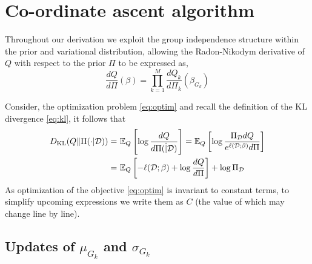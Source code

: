 \documentclass[12pt]{article}
\begin{document}
\section{Co-ordinate ascent algorithm}

Throughout our derivation we exploit the group independence structure within the prior and variational distribution, allowing the Radon-Nikodym derivative of $Q$ with respect to the prior $\Pi$ to be expressed as,
\begin{equation}
    \frac{dQ}{d\Pi}(\beta) = \prod_{k=1}^{M} \frac{dQ_k}{d\Pi_k} (\beta_{G_k})
\end{equation}

Consider, the optimization problem \eqref{eq:optim} and recall the definition of the KL divergence \eqref{eq:kl}, it follows that
\begin{align}
    D_\text{KL}(Q \| \Pi(\cdot | \mathcal{D})) 
    = &\ \mathbb{E}_{Q} \left[ \log \frac{dQ}{d\Pi(\dot | \mathcal{D})} \right] 
    = \mathbb{E}_Q \left[ \log \frac{\Pi_{\mathcal{D}} dQ}{e^{\ell(\mathcal{D}; \beta)} d\Pi} \right] \nonumber \\
    =&\ \mathbb{E}_Q \left[ -\ell(\mathcal{D}; \beta) + \log \frac{dQ}{d\Pi} \right] + \log \Pi_{\mathcal{D}} \label{eq:opt} 
\end{align}
As optimization of the objective \eqref{eq:optim} is invariant to constant terms, to simplify upcoming expressions we write them as $C$ (the value of which may change line by line).

\subsection{Updates of $\mu_{G_k}$ and $\sigma_{G_k}$}
\end{document}
